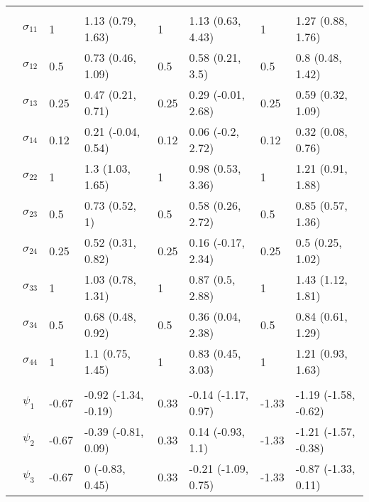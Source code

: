 \documentclass[]{article}
\begin{document}
\begin{table}[t]
\begin{tabular}{llllllll}
\addlinespace[0.3em]
\multicolumn{8}{l}{\textbf{ }}\\
\hspace{1em} & $\sigma_{11}$ & 1 & 1.13 (0.79, 1.63) & 1 & 1.13 (0.63, 4.43) & 1 & 1.27 (0.88, 1.76)\\
\hspace{1em} & $\sigma_{12}$ & 0.5 & 0.73 (0.46, 1.09) & 0.5 & 0.58 (0.21, 3.5) & 0.5 & 0.8 (0.48, 1.42)\\
\hspace{1em} & $\sigma_{13}$ & 0.25 & 0.47 (0.21, 0.71) & 0.25 & 0.29 (-0.01, 2.68) & 0.25 & 0.59 (0.32, 1.09)\\
\hspace{1em} & $\sigma_{14}$ & 0.12 & 0.21 (-0.04, 0.54) & 0.12 & 0.06 (-0.2, 2.72) & 0.12 & 0.32 (0.08, 0.76)\\
\hspace{1em} & $\sigma_{22}$ & 1 & 1.3 (1.03, 1.65) & 1 & 0.98 (0.53, 3.36) & 1 & 1.21 (0.91, 1.88)\\
\hspace{1em} & $\sigma_{23}$ & 0.5 & 0.73 (0.52, 1) & 0.5 & 0.58 (0.26, 2.72) & 0.5 & 0.85 (0.57, 1.36)\\
\hspace{1em} & $\sigma_{24}$ & 0.25 & 0.52 (0.31, 0.82) & 0.25 & 0.16 (-0.17, 2.34) & 0.25 & 0.5 (0.25, 1.02)\\
\hspace{1em} & $\sigma_{33}$ & 1 & 1.03 (0.78, 1.31) & 1 & 0.87 (0.5, 2.88) & 1 & 1.43 (1.12, 1.81)\\
\hspace{1em} & $\sigma_{34}$ & 0.5 & 0.68 (0.48, 0.92) & 0.5 & 0.36 (0.04, 2.38) & 0.5 & 0.84 (0.61, 1.29)\\
\hspace{1em} & $\sigma_{44}$ & 1 & 1.1 (0.75, 1.45) & 1 & 0.83 (0.45, 3.03) & 1 & 1.21 (0.93, 1.63)\\
\addlinespace[0.3em]
\multicolumn{8}{l}{\textbf{ }}\\
\hspace{1em} & $\psi_{1}$ & -0.67 & -0.92 (-1.34, -0.19) & 0.33 & -0.14 (-1.17, 0.97) & -1.33 & -1.19 (-1.58, -0.62)\\
\hspace{1em} & $\psi_{2}$ & -0.67 & -0.39 (-0.81, 0.09) & 0.33 & 0.14 (-0.93, 1.1) & -1.33 & -1.21 (-1.57, -0.38)\\
\hspace{1em} & $\psi_{3}$ & -0.67 & 0 (-0.83, 0.45) & 0.33 & -0.21 (-1.09, 0.75) & -1.33 & -0.87 (-1.33, 0.11)\\

\end{tabular}
\end{table}
\end{document}
